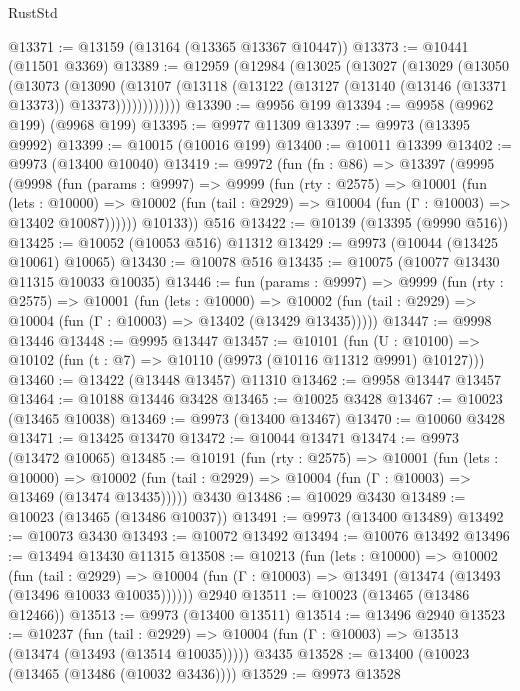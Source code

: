 \begin{lexlean}{RustStd}
\begin{coremodule}
@13371 := @13159 (@13164 (@13365 @13367 @10447))
@13373 := @10441 (@11501 @3369)
@13389 := @12959
    (@12984
      (@13025
        (@13027
          (@13029
            (@13050
              (@13073
                (@13090
                  (@13107
                    (@13118 (@13122 (@13127 (@13140 (@13146 (@13371 @13373)) @13373))))))))))))
@13390 := @9956 @199
@13394 := @9958 (@9962 @199) (@9968 @199)
@13395 := @9977 @11309
@13397 := @9973 (@13395 @9992)
@13399 := @10015 (@10016 @199)
@13400 := @10011 @13399
@13402 := @9973 (@13400 @10040)
@13419 := @9972
    (fun (fn : @86) =>
    @13397
      (@9995
        (@9998
          (fun (params : @9997) =>
          @9999
            (fun (rty : @2575) =>
            @10001
              (fun (lets : @10000) =>
              @10002 (fun (tail : @2929) => @10004 (fun (Γ : @10003) => @13402 @10087))))))
        @10133))
    @516
@13422 := @10139 (@13395 (@9990 @516))
@13425 := @10052 (@10053 @516) @11312
@13429 := @9973 (@10044 (@13425 @10061) @10065)
@13430 := @10078 @516
@13435 := @10075 (@10077 @13430 @11315 @10033 @10035)
@13446 := fun (params : @9997) =>
  @9999
    (fun (rty : @2575) =>
    @10001
      (fun (lets : @10000) =>
      @10002 (fun (tail : @2929) => @10004 (fun (Γ : @10003) => @13402 (@13429 @13435)))))
@13447 := @9998 @13446
@13448 := @9995 @13447
@13457 := @10101
    (fun (U : @10100) => @10102 (fun (t : @7) => @10110 (@9973 (@10116 @11312 @9991) @10127)))
@13460 := @13422 (@13448 @13457) @11310
@13462 := @9958 @13447 @13457
@13464 := @10188 @13446 @3428
@13465 := @10025 @3428
@13467 := @10023 (@13465 @10038)
@13469 := @9973 (@13400 @13467)
@13470 := @10060 @3428
@13471 := @13425 @13470
@13472 := @10044 @13471
@13474 := @9973 (@13472 @10065)
@13485 := @10191
    (fun (rty : @2575) =>
    @10001
      (fun (lets : @10000) =>
      @10002 (fun (tail : @2929) => @10004 (fun (Γ : @10003) => @13469 (@13474 @13435)))))
    @3430
@13486 := @10029 @3430
@13489 := @10023 (@13465 (@13486 @10037))
@13491 := @9973 (@13400 @13489)
@13492 := @10073 @3430
@13493 := @10072 @13492
@13494 := @10076 @13492
@13496 := @13494 @13430 @11315
@13508 := @10213
    (fun (lets : @10000) =>
    @10002
      (fun (tail : @2929) =>
      @10004 (fun (Γ : @10003) => @13491 (@13474 (@13493 (@13496 @10033 @10035))))))
    @2940
@13511 := @10023 (@13465 (@13486 @12466))
@13513 := @9973 (@13400 @13511)
@13514 := @13496 @2940
@13523 := @10237
    (fun (tail : @2929) => @10004 (fun (Γ : @10003) => @13513 (@13474 (@13493 (@13514 @10035)))))
    @3435
@13528 := @13400 (@10023 (@13465 (@13486 (@10032 @3436))))
@13529 := @9973 @13528

\end{coremodule}
\end{lexlean}
